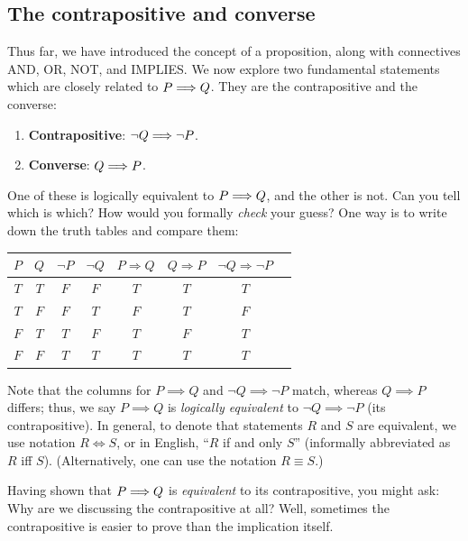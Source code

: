\documentclass[11pt]{article}
\begin{document}

\subsection{The contrapositive and converse}\label{sscn:contra}
Thus far, we have introduced the concept of a proposition, along with connectives AND, OR, NOT, and IMPLIES. We now explore two fundamental statements which are closely related to $P\Longrightarrow Q$. They are the contrapositive and the converse:
\begin{enumerate}
    \item \textbf{Contrapositive}: $\neg Q \Longrightarrow \neg P$.
    \item  \textbf{Converse}: $Q \Longrightarrow P$.
\end{enumerate}
One of these is logically equivalent to $P\Longrightarrow Q$, and the other is not. Can you tell which is which? How would you formally \emph{check} your guess? One way is to write down the truth tables and compare them:
\begin{center}
\begin{tabular}{|c|c|c|c||c|c|c|c|}
\hline
$P$     & $Q$     & $\neg P$& $\neg Q$ & $P \Longrightarrow Q$ & $Q \Longrightarrow P$ & $\neg Q \Longrightarrow \neg P$  \\
\hline
$T$  & $T$  & $F$ & $F$ & $T$  & $T$  & $T$ \\
$T$  & $F$ & $F$ & $T$ & $F$  & $T$  & $F$  \\
$F$ & $T$  & $T$ & $F$ & $T$  & $F$  & $T$  \\
$F$ & $F$ & $T$ & $T$ & $T$  & $T$  & $T$  \\
\hline
\end{tabular}
\end{center}
Note that the columns for $P\implies Q$ and $\neg Q\implies \neg P$ match, whereas $Q\implies P$ differs; thus, we say $P\implies Q$ is \emph{logically equivalent} to $\neg Q\implies \neg P$ (its contrapositive). In general, to denote that statements $R$ and $S$ are equivalent, we use notation $R\iff S$, or in English, ``$R$ if and only $S$'' (informally abbreviated as $R$ iff $S$). (Alternatively, one can use the notation $R\equiv S$.) 

Having shown that $P\Longrightarrow Q$ is \emph{equivalent} to its contrapositive, you might ask: Why are we discussing the contrapositive at all? Well, sometimes the contrapositive is easier to prove than the implication itself.
\end{document}
